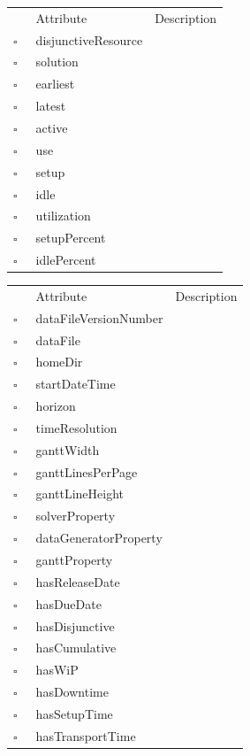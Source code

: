 \begin{table}
\caption{ResourceUtilization  }

\begin{longtable}{llp{8cm}}
& Attribute & Description \\
$\square$\ & disjunctiveResource &  \\
$\square$\ & solution &  \\
$\square$\ & earliest &  \\
$\square$\ & latest &  \\
$\square$\ & active &  \\
$\square$\ & use &  \\
$\square$\ & setup &  \\
$\square$\ & idle &  \\
$\square$\ & utilization &  \\
$\square$\ & setupPercent &  \\
$\square$\ & idlePercent &  \\
\end{longtable}
\label{attr:ResourceUtilization}
\end{table}

\begin{table}
\caption{Scenario  This class describes the dataset for the application. Typically there is a single instance of this class in the application at all times.}

\begin{longtable}{llp{8cm}}
& Attribute & Description \\
$\square$\ & dataFileVersionNumber &  \\
$\square$\ & dataFile &  \\
$\square$\ & homeDir &  \\
$\square$\ & startDateTime &  \\
$\square$\ & horizon &  \\
$\square$\ & timeResolution &  \\
$\square$\ & ganttWidth &  \\
$\square$\ & ganttLinesPerPage &  \\
$\square$\ & ganttLineHeight &  \\
$\square$\ & solverProperty &  \\
$\square$\ & dataGeneratorProperty &  \\
$\square$\ & ganttProperty &  \\
$\square$\ & hasReleaseDate &  \\
$\square$\ & hasDueDate &  \\
$\square$\ & hasDisjunctive &  \\
$\square$\ & hasCumulative &  \\
$\square$\ & hasWiP &  \\
$\square$\ & hasDowntime &  \\
$\square$\ & hasSetupTime &  \\
$\square$\ & hasTransportTime &  \\
\end{longtable}
\label{attr:Scenario}
\end{table}

